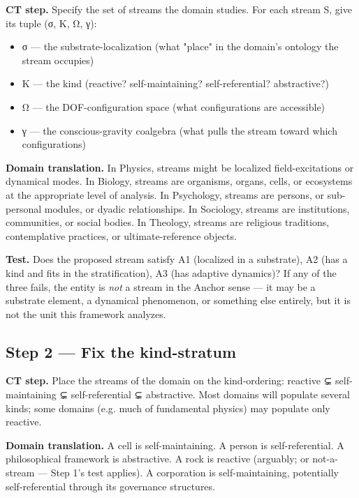 \documentclass[11pt, openany]{book}
\begin{document}
\textbf{CT step.} Specify the set of streams the domain studies. For each stream S, give its tuple (σ, K, Ω, γ):

\begin{itemize}
\item σ --- the substrate-localization (what "place" in the domain's ontology the stream occupies)
\item K --- the kind (reactive? self-maintaining? self-referential? abstractive?)
\item Ω --- the DOF-configuration space (what configurations are accessible)
\item γ --- the conscious-gravity coalgebra (what pulls the stream toward which configurations)
\end{itemize}

\textbf{Domain translation.} In Physics, streams might be localized field-excitations or dynamical modes. In Biology, streams are organisms, organs, cells, or ecosystems at the appropriate level of analysis. In Psychology, streams are persons, or sub-personal modules, or dyadic relationships. In Sociology, streams are institutions, communities, or social bodies. In Theology, streams are religious traditions, contemplative practices, or ultimate-reference objects.

\textbf{Test.} Does the proposed stream satisfy A1 (localized in a substrate), A2 (has a kind and fits in the stratification), A3 (has adaptive dynamics)? If any of the three fails, the entity is \textit{not} a stream in the Anchor sense --- it may be a substrate element, a dynamical phenomenon, or something else entirely, but it is not the unit this framework analyzes.

\subsection{Step 2 --- Fix the kind-stratum}

\textbf{CT step.} Place the streams of the domain on the kind-ordering: reactive ⊊ self-maintaining ⊊ self-referential ⊊ abstractive. Most domains will populate several kinds; some domains (e.g. much of fundamental physics) may populate only reactive.

\textbf{Domain translation.} A cell is self-maintaining. A person is self-referential. A philosophical framework is abstractive. A rock is reactive (arguably; or not-a-stream --- Step 1's test applies). A corporation is self-maintaining, potentially self-referential through its governance structures.
\end{document}
